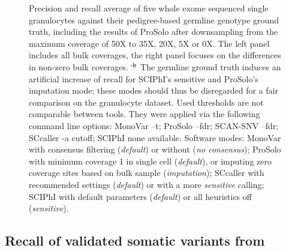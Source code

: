 \documentclass[authoryear,preprint,11pt]{scrartcl}
\begin{document}
\begin{figure}[!tpb]
\begin{minipage}[t]{.58\linewidth}
 \end{minipage}\newline
 \caption{
  Precision and recall average of five whole exome sequenced single granulocytes against their pedigree-based germline genotype ground truth, including the results of ProSolo after downsampling from the maximum coverage of 50X to 35X, 20X, 5X or 0X.
  The left panel includes all bulk coverages, the right panel focuses on the differences in non-zero bulk coverages.\newline 
  $^\text{\sffamily-b}$ The germline ground truth induces an artificial increase of recall for SCIPhI's sensitive and ProSolo's imputation mode; these modes should thus be disregarded for a fair comparison on the granulocyte dataset.\newline \footnotesize
  Used thresholds are not comparable between tools.
  They were applied via the following command line options:
  MonoVar {\ttfamily --t};
  ProSolo {\ttfamily --fdr};
  SCAN-SNV {\ttfamily --fdr};
  SCcaller {\ttfamily -a cutoff};
  SCIPhI {\ttfamily none available}.
  Software modes:
  MonoVar with consensus filtering ({\itshape default}) or without ({\itshape no consensus});
  ProSolo with minimum coverage 1 in single cell ({\itshape default}), or imputing zero coverage sites based on bulk sample ({\itshape imputation});
  SCcaller with recommended settings ({\itshape default}) or with a more {\itshape sensitive} calling;
  SCIPhI with default parameters ({\itshape default}) or all heuristics off ({\itshape sensitive}).
  }
 \label{fig:downsampling}
\end{figure}


\subsection{Recall of validated somatic variants from \cite{wang_clonal_2014}} \label{sec:somatic-recall}
\end{document}
